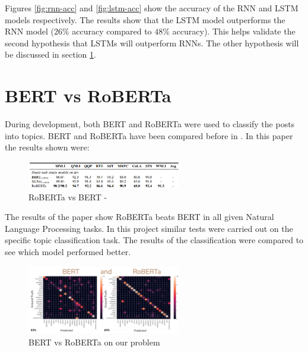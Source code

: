 Figures \ref{fig:rnn-acc} and \ref{fig:lstm-acc} show the accuracy of the RNN and LSTM models respectively. The results show that
the LSTM model outperforms the RNN model ($26\%$ accuracy compared to $48\%$ accuracy). This helps validate the second hypothesis
that LSTMs will outperform RNNs. The other hypothesis will be discussed in section \ref{sec:bert-vs-roberta}.
\section{BERT vs RoBERTa}
\label{sec:bert-vs-roberta}
During development, both BERT and RoBERTa were used to classify the posts into topics.
BERT and RoBERTa have been compared before in \cite{DBLP:journals/corr/abs-1907-11692}. In this paper the results shown were:
\begin{figure}
    \centering
    \includegraphics[width=0.6\textwidth]{../images/roberta-tasks.png}
    \caption{RoBERTa vs BERT - \cite{DBLP:journals/corr/abs-1907-11692}}
    \label{fig:bert-vs-roberta-paper}
\end{figure}

The results of the paper show RoBERTa beats BERT in all given Natural Language Processing tasks. In this project similar tests
were carried out on the specific topic classification task. The results of the classification were
compared to see which model performed better.
\begin{figure}[hbtp]
    \centering
    \includegraphics[width=0.6\textwidth]{../images/bert-vs-roberta.png}
    \caption{BERT vs RoBERTa on our problem}
    \label{fig:bert-vs-roberta}
\end{figure}

